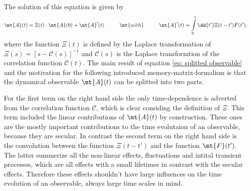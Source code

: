 The solution of this equation is given by
%
\begin{align}
	\mt{A}(t) = \Xi(t) \cdot \mt{A}(0) + \mt{A}'(t) \hspace{1cm} \mt{with} \hspace{1cm} \mt{A}'(t) = \int\limits_{0}^{t} \dd{t'} \Xi(t-t') F(t'),
	\label{eq: splitted observable}
\end{align}
%
where the function $\Xi(t)$ is defined by the Laplace transformation of $\Xi(s) = [s-\mathcal{C}(s)]^{-1}$ and $\mathcal{C}(s)$ is the Laplace transformtion of the correlation function $\mathcal{C}(t)$.
The main result of equation \eqref{eq: splitted observable} and the motivation for the following introduced memory-matrix-formalism is that the dynamical observable $\mt{A}(t)$ can be splitted into two parts.

For the first term on the right hand side the only time-dependence is adverted from the correlation function $\mathcal{C}$, which is clear considing the definition of $\Xi$.
This term included the linear contributions of $\mt{A}(t)$ by construction.
These ones are the mostly important contributions to the time evolutaion of an observable, because they are secular.
In contrast the second term on the right hand side is the convolution between the function $\Xi(t-t')$ and the function $\mt{F}(t')$.
The latter summerize all the non-linear effects, fluctuations and intital transient processes, which are all effects with a small lifetimes in contrast with the secular effects.
Therefore these effects shouldn't have large influences on the time evolution of an observable, always large time scales in mind.

